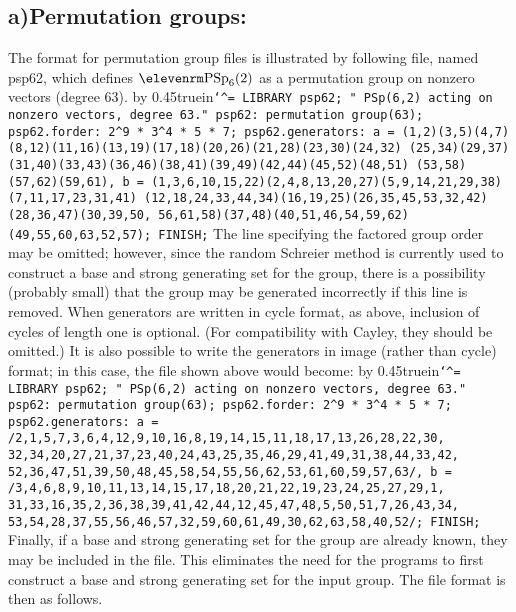 \subsection{a)\enskip Permutation groups:}The format for permutation group files
is illustrated by following file, named {\filenamefont psp62}, which defines
${\rm PSp}_6(2)$ as a permutation group
on nonzero vectors (degree 63).
\medbreak
\vbox{{\elevenpoint\advance\leftskip by 0.45truein\obeywhitespace\tt\catcode`^=\other
LIBRARY psp62;
" PSp(6,2) acting on nonzero vectors, degree 63."
psp62: permutation group(63);
psp62.forder: 2^9 * 3^4 * 5 * 7;
psp62.generators:
  a = (1,2)(3,5)(4,7)(8,12)(11,16)(13,19)(17,18)(20,26)(21,28)(23,30)(24,32)
      (25,34)(29,37)(31,40)(33,43)(36,46)(38,41)(39,49)(42,44)(45,52)(48,51)
      (53,58)(57,62)(59,61),
  b = (1,3,6,10,15,22)(2,4,8,13,20,27)(5,9,14,21,29,38)(7,11,17,23,31,41)
      (12,18,24,33,44,34)(16,19,25)(26,35,45,53,32,42)(28,36,47)(30,39,50,
      56,61,58)(37,48)(40,51,46,54,59,62)(49,55,60,63,52,57);
FINISH;\vskip0pt}}
\medbreak
The line specifying the factored group order may be omitted; however, since the
random Schreier method is currently used to construct a base and strong
generating set for the group, there is a possibility (probably small) that
the group may be generated incorrectly if this line is removed.  
When generators are written in cycle format, as above, inclusion of cycles
of length one is optional.  (For compatibility with Cayley, they should be
omitted.)
It is also
possible to write the generators in image (rather than cycle) format; in
this case, the file shown above would become:
\medbreak
\vbox{{\elevenpoint\advance\leftskip by 0.45truein\obeywhitespace\tt\catcode`^=\other
LIBRARY psp62;
" PSp(6,2) acting on nonzero vectors, degree 63."
psp62: permutation group(63);
psp62.forder: 2^9 * 3^4 * 5 * 7;
psp62.generators:
   a = /2,1,5,7,3,6,4,12,9,10,16,8,19,14,15,11,18,17,13,26,28,22,30,
        32,34,20,27,21,37,23,40,24,43,25,35,46,29,41,49,31,38,44,33,42,
        52,36,47,51,39,50,48,45,58,54,55,56,62,53,61,60,59,57,63/,
   b = /3,4,6,8,9,10,11,13,14,15,17,18,20,21,22,19,23,24,25,27,29,1,
        31,33,16,35,2,36,38,39,41,42,44,12,45,47,48,5,50,51,7,26,43,34,
        53,54,28,37,55,56,46,57,32,59,60,61,49,30,62,63,58,40,52/;
FINISH;\vskip0pt}}
\medbreak
Finally, if a base and strong generating set for the group are already
known, they may be included in the file.  This eliminates the need for
the programs to first construct a base and strong generating set for
the input group.  The file format is then as follows.
\nobreak\medskip\nobreak
